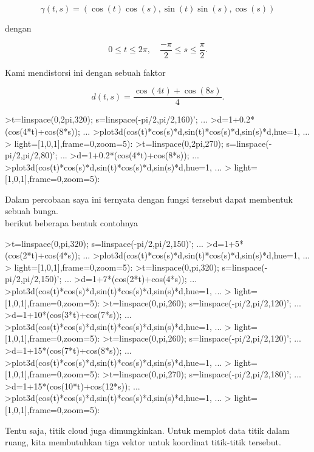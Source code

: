 \documentclass{article}
\begin{document}
\begin{eulernotebook}
\begin{eulercomment}
\begin{eulercomment}
\begin{eulercomment}
\end{eulercomment}
\begin{eulerformula}
\[
\gamma(t,s) = (\cos(t)\cos(s),\sin(t)\sin(s),\cos(s))
\]
\end{eulerformula}
\begin{eulercomment}
dengan

\end{eulercomment}
\begin{eulerformula}
\[
0 \le t \le 2\pi, \quad \frac{-\pi}{2} \le s \le \frac{\pi}{2}.
\]
\end{eulerformula}
\begin{eulercomment}
Kami mendistorsi ini dengan sebuah faktor

\end{eulercomment}
\begin{eulerformula}
\[
d(t,s) = \frac{\cos(4t)+\cos(8s)}{4}.
\]
\end{eulerformula}
\begin{eulerprompt}
>t=linspace(0,2pi,320); s=linspace(-pi/2,pi/2,160)'; ...
>d=1+0.2*(cos(4*t)+cos(8*s)); ...
>plot3d(cos(t)*cos(s)*d,sin(t)*cos(s)*d,sin(s)*d,hue=1, ...
>  light=[1,0,1],frame=0,zoom=5):
>t=linspace(0,2pi,270); s=linspace(-pi/2,pi/2,80)'; ...
>d=1+0.2*(cos(4*t)+cos(8*s)); ...
>plot3d(cos(t)*cos(s)*d,sin(t)*cos(s)*d,sin(s)*d,hue=1, ...
>  light=[1,0,1],frame=0,zoom=5):
\end{eulerprompt}
\begin{eulercomment}
Dalam percobaan saya ini ternyata dengan fungsi tersebut dapat
membentuk sebuah bunga.\\
berikut beberapa bentuk contohnya
\end{eulercomment}
\begin{eulerprompt}
>t=linspace(0,pi,320); s=linspace(-pi/2,pi/2,150)'; ...
>d=1+5*(cos(2*t)+cos(4*s)); ...
>plot3d(cos(t)*cos(s)*d,sin(t)*cos(s)*d,sin(s)*d,hue=1, ...
>  light=[1,0,1],frame=0,zoom=5):
>t=linspace(0,pi,320); s=linspace(-pi/2,pi/2,150)'; ...
>d=1+7*(cos(2*t)+cos(4*s)); ...
>plot3d(cos(t)*cos(s)*d,sin(t)*cos(s)*d,sin(s)*d,hue=1, ...
>  light=[1,0,1],frame=0,zoom=5):
>t=linspace(0,pi,260); s=linspace(-pi/2,pi/2,120)'; ...
>d=1+10*(cos(3*t)+cos(7*s)); ...
>plot3d(cos(t)*cos(s)*d,sin(t)*cos(s)*d,sin(s)*d,hue=1, ...
>  light=[1,0,1],frame=0,zoom=5):
>t=linspace(0,pi,260); s=linspace(-pi/2,pi/2,120)'; ...
>d=1+15*(cos(7*t)+cos(8*s)); ...
>plot3d(cos(t)*cos(s)*d,sin(t)*cos(s)*d,sin(s)*d,hue=1, ...
>  light=[1,0,1],frame=0,zoom=5):
>t=linspace(0,pi,270); s=linspace(-pi/2,pi/2,180)'; ...
>d=1+15*(cos(10*t)+cos(12*s)); ...
>plot3d(cos(t)*cos(s)*d,sin(t)*cos(s)*d,sin(s)*d,hue=1, ...
>  light=[1,0,1],frame=0,zoom=5):
\end{eulerprompt}
\begin{eulercomment}
Tentu saja, titik cloud juga dimungkinkan. Untuk memplot data titik
dalam ruang, kita membutuhkan tiga vektor untuk koordinat titik-titik
tersebut.


\end{eulercomment}
\end{eulercomment}
\end{eulercomment}
\end{eulernotebook}
\end{document}
